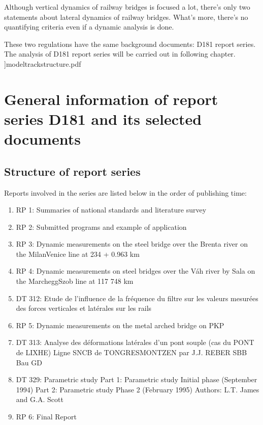 \begin{appendices}
Although vertical dynamics of railway bridges is focused a lot, there's only two statements about lateral dynamics of railway bridges. What's more, there's no quantifying criteria even if a dynamic analysis is done. 

These two regulations have the same background documents: D181 report series. The analysis of D181 report series will be carried out in following chapter.
]{modeltrackstructure.pdf}

\chapter{General information of report series D181 and its selected documents}\label{app:generalInformationD181}

\section{Structure of report series}

Reports involved in the series are listed below in the order of publishing time:

\begin{enumerate}
    \item RP 1: Summaries of national standards and literature survey
    \item RP 2: Submitted programs and example of application
    \item RP 3: Dynamic measurements on the steel bridge over the Brenta river on the MilanVenice line at 234 + 0.963 km
    \item RP 4: Dynamic measurements on steel bridges over the Váh river by Sala on the MarcheggSzob line at 117 748 km
    \item DT 312: Etude de l'influence de la fréquence du filtre sur les valeurs mesurées des forces verticales et latérales sur les rails
    \item RP 5: Dynamic measurements on the metal arched bridge on PKP
    \item DT 313: Analyse des déformations latérales d'un pont souple (cas du PONT de LIXHE) Ligne SNCB de TONGRESMONTZEN par J.J. REBER SBB Bau GD
    \item DT 329: Parametric study Part 1: Parametric study Initial phase (September 1994) Part 2: Parametric study Phase 2 (February 1995) Authors: L.T. James and G.A. Scott
    \item RP 6: Final Report
\end{enumerate}


\end{appendices}
